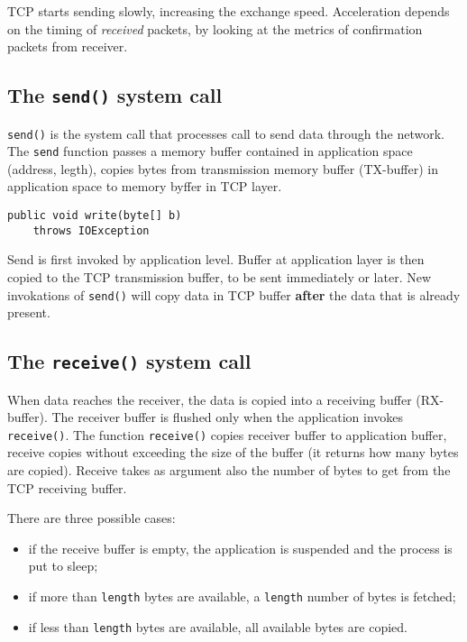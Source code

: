 \documentclass[a4paper, 12pt]{report}
\begin{document}
TCP starts sending slowly, increasing the exchange speed. Acceleration depends
on the timing of \emph{received} packets, by looking at the metrics of
confirmation packets from receiver.

\subsection{The \texttt{send()} system call}

\texttt{send()} is the system call that processes call to send data through the
network. The \texttt{send} function passes a memory buffer contained in
application space (address, legth), copies bytes from transmission memory
buffer (TX-buffer) in application space to memory byffer in TCP layer.

\begin{lstlisting}
public void write(byte[] b)
	throws IOException
\end{lstlisting}

Send is first invoked by application level. Buffer at application layer is then
copied to the TCP transmission buffer, to be sent immediately or later. New
invokations of \texttt{send()} will copy data in TCP buffer \textbf{after} the
data that is already present. 

\subsection{The \texttt{receive()} system call}

When data reaches the receiver, the data is copied into a receiving buffer
(RX-buffer). The receiver buffer is flushed only when the application invokes
\texttt{receive()}. The function \texttt{receive()} copies receiver buffer to
application buffer, receive copies without exceeding the size of the buffer (it
returns how many bytes are copied). Receive takes as argument also the number
of bytes to get from the TCP receiving buffer.

There are three possible cases:

\begin{itemize}
	\item if the receive buffer is empty, the application is suspended and
		the process is put to sleep;
	\item if more than \texttt{length} bytes are available, a
		\texttt{length} number of bytes is fetched;
	\item if less than \texttt{length} bytes are available, all available
		bytes are copied.
\end{itemize}
\end{document}
